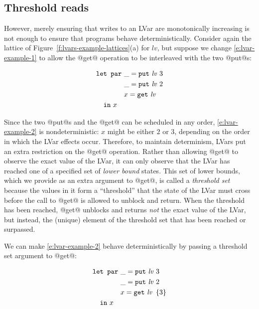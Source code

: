 \subsection{Threshold reads}

However, merely ensuring that writes to an LVar are monotonically
increasing is not enough to ensure that programs behave
deterministically.  Consider again the lattice of
Figure~\ref{f:lvars-example-lattices}(a) for $\mathit{lv}$, but
suppose we change \ref{e:lvar-example-1} to allow the @get@ operation
to be interleaved with the two @put@s:

\singlespacing
\begin{equation}
\begin{split}
& \LETPAR ~\_ = \putexp{\mathit{lv}}{3} \\
&  \letparspace ~\_ = \putexp{\mathit{lv}}{2} \\
&  \letparspace ~x = \GET~\mathit{lv} \\
&  \letspace \IN~x
\end{split}
\label{e:lvar-example-2}
\end{equation}
\doublespacing

Since the two @put@s and the @get@ can be scheduled in any order,
\ref{e:lvar-example-2} is nondeterministic: $x$ might be either $2$ or
$3$, depending on the order in which the LVar effects occur.
Therefore, to maintain determinism, LVars put an extra restriction on
the @get@ operation.  Rather than allowing @get@ to observe the exact
value of the LVar, it can only observe that the LVar has reached one
of a specified set of \emph{lower bound} states.  This set of lower
bounds, which we provide as an extra argument to @get@, is called a
\emph{threshold set} because the values in it form a ``threshold''
that the state of the LVar must cross before the call to @get@ is
allowed to unblock and return.  When the threshold has been reached,
@get@ unblocks and returns \emph{not} the exact value of the LVar, but
instead, the (unique) element of the threshold set that has been
reached or surpassed.

We can make \ref{e:lvar-example-2} behave deterministically by passing
a threshold set argument to @get@:

\singlespacing
\begin{equation}
\begin{split}
& \LETPAR ~\_ = \putexp{\mathit{lv}}{3} \\
&  \letparspace ~\_ = \putexp{\mathit{lv}}{2} \\
&  \letparspace ~x = \getexp{\mathit{lv}}{\setof{3}} \\
&  \letspace \IN~x
\end{split}
\label{e:lvar-example-3}
\end{equation}
\doublespacing

